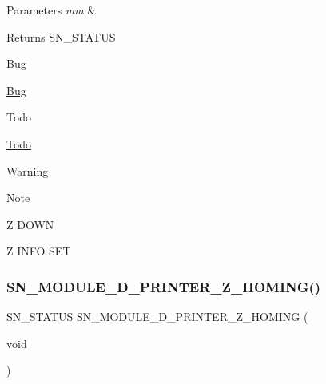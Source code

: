 \begin{DoxyParams}{Parameters}
{\em mm} & \\
\hline
\end{DoxyParams}
\begin{DoxyReturn}{Returns}
S\+N\+\_\+\+S\+T\+A\+T\+US 
\end{DoxyReturn}
\begin{DoxyRefDesc}{Bug}
\item[\hyperlink{bug__bug000011}{Bug}]\end{DoxyRefDesc}
\begin{DoxyRefDesc}{Todo}
\item[\hyperlink{todo__todo000011}{Todo}]\end{DoxyRefDesc}
\begin{DoxyWarning}{Warning}

\end{DoxyWarning}
\begin{DoxyNote}{Note}

\end{DoxyNote}
Z D\+O\+WN

Z I\+N\+FO S\+ET \mbox{\label{group__Module_gafa7b9a2a41989695e1b881b984794432}} 
\subsubsection{\texorpdfstring{S\+N\+\_\+\+M\+O\+D\+U\+L\+E\+\_\+D\+\_\+\+P\+R\+I\+N\+T\+E\+R\+\_\+\+Z\+\_\+\+H\+O\+M\+I\+N\+G()}{SN\_MODULE\_3D\_PRINTER\_Z\_HOMING()}}
{\footnotesize\ttfamily S\+N\+\_\+\+S\+T\+A\+T\+US S\+N\+\_\+\+M\+O\+D\+U\+L\+E\+\_\+D\+\_\+\+P\+R\+I\+N\+T\+E\+R\+\_\+\+Z\+\_\+\+H\+O\+M\+I\+NG (\begin{DoxyParamCaption}\item[{void}]{ }\end{DoxyParamCaption})}


